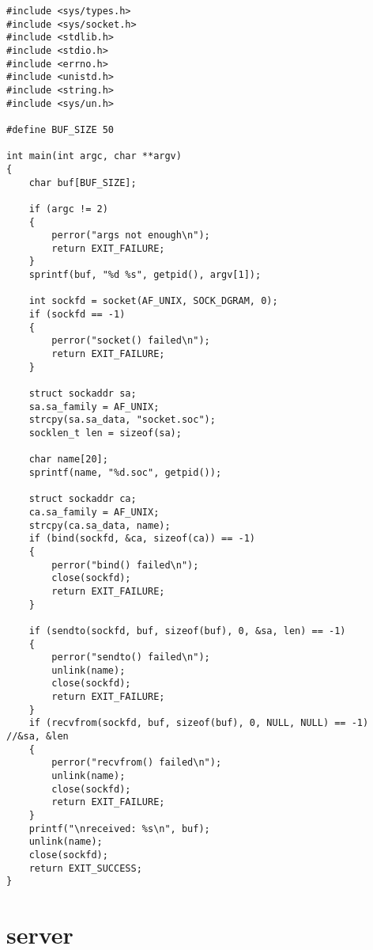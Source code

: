 \begin{lstlisting}
#include <sys/types.h>
#include <sys/socket.h>
#include <stdlib.h>
#include <stdio.h>
#include <errno.h>
#include <unistd.h>
#include <string.h>
#include <sys/un.h>

#define BUF_SIZE 50

int main(int argc, char **argv)
{
    char buf[BUF_SIZE];

    if (argc != 2)
    {
        perror("args not enough\n");
        return EXIT_FAILURE;
    }
    sprintf(buf, "%d %s", getpid(), argv[1]);

    int sockfd = socket(AF_UNIX, SOCK_DGRAM, 0);
    if (sockfd == -1)
    {
        perror("socket() failed\n");
        return EXIT_FAILURE;
    }

    struct sockaddr sa;
    sa.sa_family = AF_UNIX;
    strcpy(sa.sa_data, "socket.soc");
    socklen_t len = sizeof(sa);

    char name[20];
    sprintf(name, "%d.soc", getpid());

    struct sockaddr ca;
    ca.sa_family = AF_UNIX;
    strcpy(ca.sa_data, name);
    if (bind(sockfd, &ca, sizeof(ca)) == -1) 
    {
        perror("bind() failed\n");
        close(sockfd);
        return EXIT_FAILURE;
    }

    if (sendto(sockfd, buf, sizeof(buf), 0, &sa, len) == -1)
    {
        perror("sendto() failed\n");
        unlink(name);
        close(sockfd);
        return EXIT_FAILURE;
    }
    if (recvfrom(sockfd, buf, sizeof(buf), 0, NULL, NULL) == -1) //&sa, &len
    {
        perror("recvfrom() failed\n");
        unlink(name);
        close(sockfd);
        return EXIT_FAILURE;
    }
    printf("\nreceived: %s\n", buf);
    unlink(name);
    close(sockfd);
    return EXIT_SUCCESS;
}
\end{lstlisting}

\section*{server}

